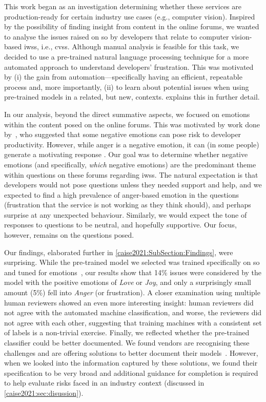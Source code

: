 This work began as an investigation determining whether these services are production-ready for certain industry use cases (e.g., computer vision). Inspired by the possibility of finding insight from content in the online forums, we wanted to analyse the issues raised on \gls{so} by developers that relate to computer vision-based \glspl{iws}, i.e., \glspl{cvs}.  Although manual analysis is feasible for this task, we decided to use a pre-trained natural language processing technique for a more automated approach to understand developers' frustration. This was motivated by (i) the gain from automation---specifically having an efficient,  repeatable process and, more importantly, (ii) to learn about potential issues when using pre-trained models in a related, but new, contexts.  explains this in further detail.

In our analysis, beyond the direct summative aspects, we focused on emotions within the content posed on the online forums. This was motivated by work done by~\citet{wrobel2013}, who suggested that some negative emotions can pose risk to developer productivity. However, while anger is a negative emotion, it can (in some people) generate a motivating response \citep{wrobel2013}. Our goal was to determine whether negative emotions (and specifically, \textit{which} negative emotions) are the predominant theme within questions on these forums regarding \glspl{iws}.  The natural expectation is that developers would not pose questions unless they needed support and help, and we expected to find a high prevalence of anger-based emotion in the questions (frustration that the service is not working as they think should), and perhaps surprise at any unexpected behaviour. Similarly, we would expect the tone of responses to questions to be neutral, and hopefully supportive. Our focus, however, remains on the questions posed.

Our findings, elaborated further in \cref{caise2021:SubSection:Findings}, were surprising. While the pre-trained model we selected was trained specifically on \gls{so} and tuned for emotions~\citep{novielli2018,calefato2017}, our results show that 14\% issues were considered by the model with the positive emotions of \textit{Love} or \textit{Joy}, and only a surprisingly small amount (5\%) fell into \textit{Anger} (or frustration). A closer examination using multiple human reviewers showed an even more interesting insight: human reviewers did not agree with the automated machine classification, and worse, the reviewers did not agree with each other, suggesting that training machines with a consistent set of labels is a non-trivial exercise.  Finally, we reflected whether the pre-trained classifier could be better documented.  We found vendors are recognising these challenges and are offering solutions to better document their models~\citep{Mitchell:2018in, Gebru:2018wh}. However, when we looked into the information captured by these solutions, we found their specification to be very broad and additional guidance for completion is required to help evaluate risks faced in an industry context (discussed in \cref{caise2021:sec:disussion}). 

